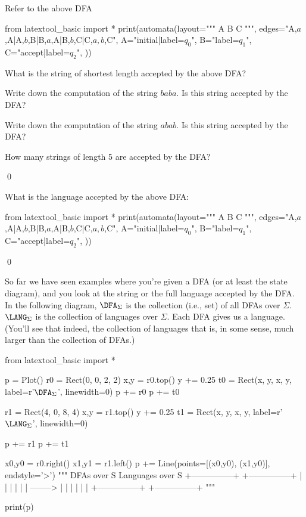 \newpage
\begin{ex}
  Refer to the above DFA
  \begin{python}
from latextool_basic import *
print(automata(layout="""
A  B  C
""",
edges="A,$a$,A|A,$b$,B|B,$a$,A|B,$b$,C|C,$a,b$,C",
A="initial|label=$q_0$",
B="label=$q_1$",
C="accept|label=$q_2$",
))
\end{python}
  \begin{tightlist}
  \item What is the string of shortest length accepted by the above DFA?
  \item  Write down the computation of the string $baba$.
    Is this string accepted by the DFA?
  \item Write down the computation of the string $abab$.
    Is this string accepted by the DFA?
  \item How many strings of length 5 are accepted by the DFA?
  \end{tightlist}
\qed
\end{ex}

\newpage
\begin{ex}
  What is the language accepted by the above DFA:
  \begin{python}
from latextool_basic import *
print(automata(layout="""
A  B  C
""",
edges="A,$a$,A|A,$b$,B|B,$a$,A|B,$b$,C|C,$a,b$,C",
A="initial|label=$q_0$",
B="label=$q_1$",
C="accept|label=$q_2$",
))
\end{python}
\qed
\end{ex}


\newpage
So far we have seen examples where you're given a DFA (or at least the state
diagram), and you look at the string or the full language accepted by the DFA.
In the following diagram, $\DFA_\Sigma$ is the collection (i.e., set)
of all DFAs over $\Sigma$.
$\LANG_\Sigma$ is the collection of languages over $\Sigma$.
Each DFA gives us a language.
(You'll see that indeed, the collection of languages that is,
in some sense, much larger than the collection of DFAs.)

\begin{python}
from latextool_basic import *

p = Plot()
r0 = Rect(0, 0, 2, 2)
x,y = r0.top()
y += 0.25
t0 = Rect(x, y, x, y, label=r'$\DFA_\Sigma$', linewidth=0)
p += r0
p += t0

r1 = Rect(4, 0, 8, 4)
x,y = r1.top()
y += 0.25
t1 = Rect(x, y, x, y, label=r'$\LANG_\Sigma$', linewidth=0)

p += r1
p += t1

x0,y0 = r0.right()
x1,y1 = r1.left()
p += Line(points=[(x0,y0), (x1,y0)], endstyle='>')
"""
DFAs over S                 Languages over S
+---------------+           +---------------+
|               |           |               |
|               | --------> |               |
|               |           |               |
+---------------+           +---------------+
"""

print(p)
\end{python}

